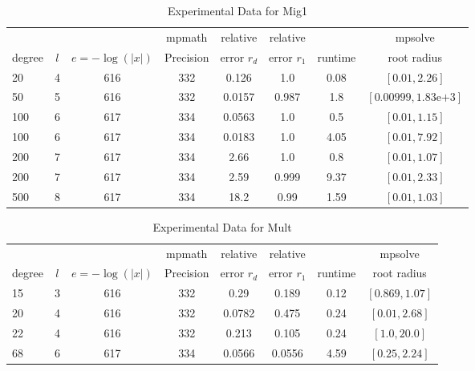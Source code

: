 \documentclass[sigconf]{acmart}
\begin{document}
\begin{table}[t]
\caption{Experimental Data for Mig1}
\label{tab:mig1}
\vskip -0.15in
\begin{center}
\begin{small}
\begin{sc}
\begin{tabular}{lccccccc}
\toprule
&  &  & mpmath & relative  & relative &  & mpsolve \\
degree  & $l$& $e=-\log(|x|)$& Precision &error $r_d$       & error $r_1$ &runtime& root radius\\
\midrule
 20 & 4 & 616 & 332 & 0.126 & 1.0 & 0.08 & $[0.01, 2.26]$\\
  50 & 5 & 616 & 332 & 0.0157 & 0.987 & 1.8 & $[0.00999, 1.83\text{e+}3]$\\
 100 & 6 & 617 & 334 & 0.0563 & 1.0 & 0.5 & $[0.01, 1.15]$\\
 100 & 6 & 617 & 334 & 0.0183 & 1.0 & 4.05 & $[0.01, 7.92]$\\
 200 & 7 & 617 & 334 & 2.66 & 1.0 & 0.8 & $[0.01, 1.07]$\\
 200 & 7 & 617 & 334 & 2.59 & 0.999 & 9.37 & $[0.01, 2.33]$\\
 500 & 8 & 617 & 334 & 18.2 & 0.99 & 1.59 & $[0.01, 1.03]$\\
\bottomrule
\end{tabular}
\end{sc}
\end{small}
\end{center}
\vskip 0.05in
\end{table}


\begin{table}[t]
\caption{Experimental Data for Mult}
\label{tab:mult}
\vskip -0.15in
\begin{center}
\begin{small}
\begin{sc}
\begin{tabular}{lccccccc}
\toprule
&  &  & mpmath & relative  & relative &  & mpsolve \\
degree  & $l$& $e=-\log(|x|)$& Precision &error $r_d$       & error $r_1$ &runtime& root radius\\
\midrule
 15 & 3 & 616 & 332 & 0.29 & 0.189 & 0.12 & $[0.869, 1.07]$\\
 20 & 4 & 616 & 332 & 0.0782 & 0.475 & 0.24 & $[0.01, 2.68]$\\
 22 & 4 & 616 & 332 & 0.213 & 0.105 & 0.24 & $[1.0, 20.0]$\\
  68 & 6 & 617 & 334 & 0.0566 & 0.0556 & 4.59 & $[0.25, 2.24]$\\
\bottomrule
\end{tabular}
\end{sc}
\end{small}
\end{center}
\vskip 0.05in
\end{table}
\end{document}
